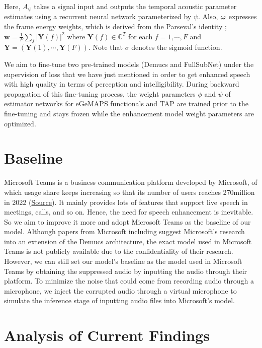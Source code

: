 \documentclass{article}
\newcommand{\abs}[1]{\left\vert#1\right\vert}
\newcommand{\Complex}{\mathbb C}
\def\wv{\mathbf w}
\def\Yv{\mathbf Y}
\newcommand{\omegav}{\mbox{\boldmath{$\omega$}}}
\begin{document}
Here, $A_\psi$ takes a signal input and outputs the temporal acoustic parameter estimates using a recurrent neural network parameterized by $\psi$. Also, $\omegav$ expresses the frame energy weights, which is derived from the Parseval's identity ; $\wv = \frac 1F \sum_{f} \abs{\Yv(f)}^2$ where $\Yv(f) \in \Complex^T$ for each $f=1, \cdots, F$ and $\Yv = (\Yv(1), \cdots, \Yv(F))$. Note that $\sigma$ denotes the sigmoid function.

We aim to fine-tune two pre-trained models (Demucs and FullSubNet) under the supervision of loss that we have just mentioned in order to get enhanced speech with high quality in terms of perception and intelligibility. During backward propagation of this fine-tuning process, the weight parameters $\phi$ and $\psi$ of estimator networks for eGeMAPS functionals and TAP are trained prior to the fine-tuning and stays frozen while the enhancement model weight parameters are optimized.

\section{Baseline}

Microsoft Teams is a business communication platform developed by Microsoft, of which usage share keeps increasing so that its number of users reaches 270million in 2022 (\href{(https://www.businessofapps.com/data/microsoft-teams-statistics/)}{Source}). It mainly provides lots of features that support live speech in meetings, calls, and so on. Hence, the need for speech enhancement is inevitable. So we aim to improve it more and adopt Microsoft Teams as the baseline of our model. Although papers from Microsoft including \cite{microsoftTeams} suggest Microsoft’s research into an extension of the Demucs architecture, the exact model used in Microsoft Teams is not publicly available due to the confidentiality of their research. However, we can still set our model’s baseline as the model used in Microsoft Teams by obtaining the suppressed audio by inputting the audio through their platform. To minimize the noise that could come from recording audio through a microphone, we inject the corrupted audio through a virtual microphone to simulate the inference stage of inputting audio files into Microsoft’s model.

\section{Analysis of Current Findings}
\end{document}
